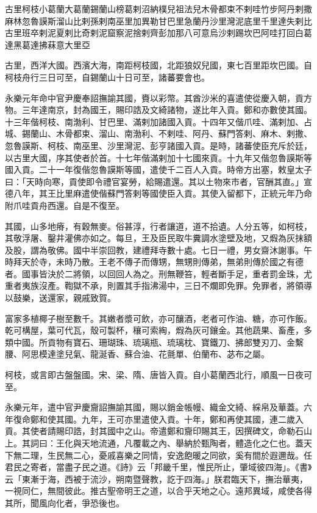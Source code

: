 
\begin{pinyinscope}
古里柯枝小葛蘭大葛蘭錫蘭山榜葛剌沼納樸兒祖法兒木骨都束不剌哇竹步阿丹剌撒麻林忽魯謨斯溜山比剌孫剌南巫里加異勒甘巴里急蘭丹沙里灣泥底里千里達失剌比古里班卒剌泥夏剌比奇剌泥窟察泥捨剌齊彭加那八可意烏沙剌踢坎巴阿哇打回白葛達黑葛達拂菻意大里亞

古里，西洋大國。西濱大海，南距柯枝國，北距狼奴兒國，東七百里距坎巴國。自柯枝舟行三日可至，自錫蘭山十日可至，諸蕃要會也。

永樂元年命中官尹慶奉詔撫諭其國，賚以彩幣。其酋沙米的喜遣使從慶入朝，貢方物。三年達南京，封為國王，賜印誥及文綺諸物，遂比年入貢。鄭和亦數使其國。十三年偕柯枝、南渤利、甘巴里、滿剌加諸國入貢。十四年又偕爪哇、滿剌加、占城、錫蘭山、木骨都束、溜山、南渤利、不剌哇、阿丹、蘇門答剌、麻木、剌撒、忽魯謨斯、柯枝、南巫里、沙里灣泥、彭亨諸國入貢。是時，諸蕃使臣充斥於廷，以古里大國，序其使者於首。十七年偕滿剌加十七國來貢。十九年又偕忽魯謨斯等國入貢。二十一年復偕忽魯謨斯等國，遣使千二百人入貢。時帝方出塞，敕皇太子曰：「天時向寒，貢使即令禮官宴勞，給賜遣還。其以土物來市者，官酬其直。」宣德八年，其王比里麻遣使偕蘇門答剌等國使臣入貢。其使入留都下，正統元年乃命附爪哇貢舟西還。自是不復至。

其國，山多地瘠，有穀無麥。俗甚淳，行者讓道，道不拾遺。人分五等，如柯枝，其敬浮屠、鑿井灌佛亦如之。每旦，王及臣民取牛糞調水塗壁及地，又煆為灰抹額及股，謂為敬佛。國中半崇回教，建禮拜寺數十處。七日一禮，男女齋沐謝事。午時拜天於寺，未時乃散。王老不傳子而傳甥，無甥則傳弟，無弟則傳於國之有德者。國事皆決於二將領，以回回人為之。刑無鞭笞，輕者斷手足，重者罰金珠，尤重者夷族沒產。鞫獄不承，則置其手指沸湯中，三日不爛即免罪。免罪者，將領導以鼓樂，送還家，親戚致賀。

富家多植椰子樹至數千。其嫩者漿可飲，亦可釀酒，老者可作油、糖，亦可作飯。乾可構屋，葉可代瓦，殼可製杯，穰可索綯，煆為灰可鑲金。其他蔬果、畜產，多類中國。所貢物有寶石、珊瑚珠、琉璃瓶、琉璃枕、寶鐵刀、拂郎雙刃刀、金繫腰、阿思模達塗兒氣、龍涎香、蘇合油、花氈單、伯蘭布、苾布之屬。

柯枝，或言即古盤盤國。宋、梁、隋、唐皆入貢。自小葛蘭西北行，順風一日夜可至。

永樂元年，遣中官尹慶齎詔撫諭其國，賜以銷金帳幔、織金文綺、綵帛及華蓋。六年復命鄭和使其國。九年，王可亦里遣使入貢。十年，鄭和再使其國，連二歲入貢。其使者請賜印誥，封其國中之山。帝遣鄭和齎印賜其王，因撰碑文，命勒石山上。其詞曰：王化與天地流通，凡覆載之內、舉納於甄陶者，體造化之仁也。蓋天下無二理，生民無二心，憂戚喜樂之同情，安逸飽暖之同欲，奚有間於遐邇哉。任君民之寄者，當盡子民之道。《詩》云「邦畿千里，惟民所止，肇域彼四海」。《書》云「東漸于海，西被于流沙，朔南暨聲教，訖于四海。」朕君臨天下，撫治華夷，一視同仁，無間彼此。推古聖帝明王之道，以合乎天地之心。遠邦異域，咸使各得其所，聞風向化者，爭恐後也。


\end{pinyinscope}
